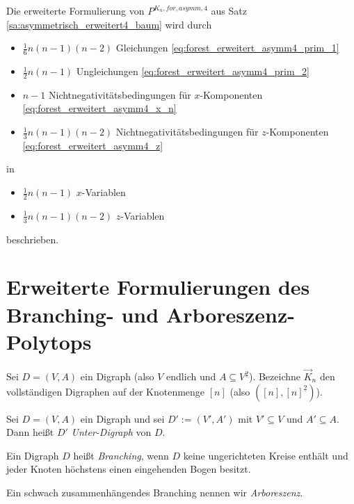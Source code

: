 \documentclass[10p,a4paper,BCOR = 12mm, DIV=15]{scrbook}
\begin{document}
{\begin{Bem}
Die erweiterte Formulierung von $P^{K_n, for, asymm, 4}$ aus Satz \ref{sa:asymmetrisch_erweitert4_baum} wird durch
\begin{itemize}
\item $\frac{1}{6} n \left(n-1\right) \left(n-2\right)$ Gleichungen \eqref{eq:forest_erweitert_asymm4_prim_1}
\item $\frac{1}{2} n \left(n-1\right)$ Ungleichungen \eqref{eq:forest_erweitert_asymm4_prim_2}
\item $n-1$ Nichtnegativitätsbedingungen für $x$-Komponenten \eqref{eq:forest_erweitert_asymm4_x_n}
\item $\frac{1}{3} n \left(n-1\right) \left(n-2\right)$ Nichtnegativitätsbedingungen für $z$-Komponenten \eqref{eq:forest_erweitert_asymm4_z}
\end{itemize}
in 
\begin{itemize}
\item $\frac{1}{2} n \left(n-1\right)$ $x$-Variablen
\item $\frac{1}{3} n \left(n-1\right) \left(n-2\right)$ $z$-Variablen
\end{itemize}
beschrieben.
\end{Bem}

\chapter{Erweiterte Formulierungen des Branching- und Arboreszenz-Polytops}

\label{sec:branch_arb}

\begin{Def}
Sei $D=\left(V, A\right)$ ein Digraph (also $V$ endlich und $A \subseteq V^{\underline{2}}$). Bezeichne $\vec{K}_n$ den vollständigen Digraphen auf der Knotenmenge $\left[n\right]$ (also $\left(\left[n\right], \left[n\right]^{\underline{2}}\right)$).
\end{Def}

\begin{Def}
Sei $D=\left(V, A\right)$ ein Digraph und sei $D':=\left(V', A'\right)$ mit $V'\subseteq V$ und $A' \subseteq A$. Dann heißt $D'$ \emph{Unter-Digraph} von $D$.
\end{Def}

\begin{Def}
Ein Digraph $D$ heißt \emph{Branching}, wenn $D$ keine ungerichteten Kreise enthält und jeder Knoten höchstens einen eingehenden Bogen besitzt.

Ein schwach zusammenhängendes Branching nennen wir \emph{Arboreszenz}.
\end{Def}

}
\end{document}
